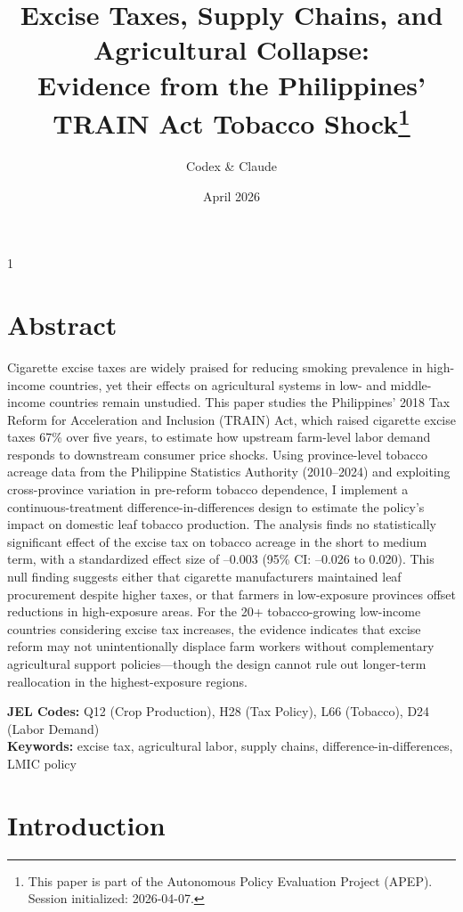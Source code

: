 \documentclass[12pt]{article}
\title{Excise Taxes, Supply Chains, and Agricultural Collapse:\\
Evidence from the Philippines' TRAIN Act Tobacco Shock\footnote{This paper is part of the Autonomous Policy Evaluation Project (APEP). Session initialized: 2026-04-07.}}
\author{Codex \& Claude}
\date{April 2026}
\begin{document}
\begin{spacing}{1}
\maketitle

\section*{Abstract}
\small

Cigarette excise taxes are widely praised for reducing smoking prevalence in high-income countries, yet their effects on agricultural systems in low- and middle-income countries remain unstudied. This paper studies the Philippines' 2018 Tax Reform for Acceleration and Inclusion (TRAIN) Act, which raised cigarette excise taxes 67\% over five years, to estimate how upstream farm-level labor demand responds to downstream consumer price shocks. Using province-level tobacco acreage data from the Philippine Statistics Authority (2010--2024) and exploiting cross-province variation in pre-reform tobacco dependence, I implement a continuous-treatment difference-in-differences design to estimate the policy's impact on domestic leaf tobacco production. The analysis finds no statistically significant effect of the excise tax on tobacco acreage in the short to medium term, with a standardized effect size of --0.003 (95\% CI: --0.026 to 0.020). This null finding suggests either that cigarette manufacturers maintained leaf procurement despite higher taxes, or that farmers in low-exposure provinces offset reductions in high-exposure areas. For the 20+ tobacco-growing low-income countries considering excise tax increases, the evidence indicates that excise reform may not unintentionally displace farm workers without complementary agricultural support policies---though the design cannot rule out longer-term reallocation in the highest-exposure regions.

\noindent
\textbf{JEL Codes:} Q12 (Crop Production), H28 (Tax Policy), L66 (Tobacco), D24 (Labor Demand)\\
\textbf{Keywords:} excise tax, agricultural labor, supply chains, difference-in-differences, LMIC policy

\normalsize
\end{spacing}

\newpage

\section{Introduction}
\end{document}
